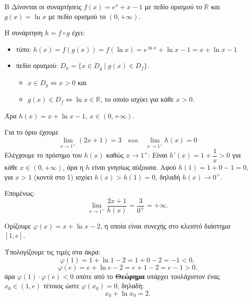 \begin{thema}{Β}
Δίνονται οι συναρτήσεις $f(x) = e^x + x - 1$ με πεδίο ορισμού το $\mathbb{R}$ και $g(x) = \ln x$ με πεδίο ορισμού το $(0, +\infty)$.

\begin{erwthma}

\item Η συνάρτηση $h = f \circ g$ έχει:
\begin{itemize}
    \item {τύπο:} $h(x) = f(g(x)) = f(\ln x) = e^{\ln x} + \ln x - 1 = x + \ln x - 1$
    \item {πεδίο ορισμού:} $D_h = \{x \in D_g \mid g(x) \in D_f\}$.
    \begin{itemize}[label=\tiny\faPlay]
        \item $x \in D_g \Leftrightarrow x > 0$ και
        \item $g(x) \in D_f \Leftrightarrow \ln x \in \mathbb{R}$, το οποίο ισχύει για κάθε $x > 0$.
    \end{itemize}
\end{itemize}
Άρα $h(x) = x + \ln x - 1$, $x \in (0, +\infty)$.

\item Για το όριο έχουμε
\[
\lim\limits_{x \to 1^+} (2x+1)=3\quad \text{και}\quad \lim\limits_{x \to 1^+} h(x)=0
\]
Ελέγχουμε το πρόσημο του $h(x)$ καθώς $x \to 1^+$:
Είναι $h'(x) = 1 + \dfrac{1}{x} > 0$ για κάθε $x \in (0,+\infty)$, άρα η $h$ είναι γνησίως αύξουσα.
Αφού $h(1) = 1 + 0 - 1 = 0$, για $x > 1$ (κοντά στο 1) ισχύει $h(x) > h(1) = 0$, δηλαδή $h(x) \to 0^+$.

Επομένως:
\[
\lim_{x \to 1^+} \frac{2x+1}{h(x)} = \frac{3}{0^+} = +\infty.
\]

\item Ορίζουμε $\varphi(x) = x + \ln x - 2$, η οποία είναι συνεχής στο κλειστό διάστημα $[1, e]$.

Υπολογίζουμε τις τιμές στα άκρα:
\[
\varphi(1) = 1 + \ln 1 - 2 = 1 + 0 - 2 = -1 < 0,
\]
\[
\varphi(e) = e + \ln e - 2 = e + 1 - 2 = e - 1 > 0.
\]
άρα $\varphi(1) \cdot \varphi(e) < 0$ οπότε από το \textbf{Θεώρημα } υπάρχει τουλάχιστον ένας $x_0 \in (1, e)$ τέτοιος ώστε $\varphi(x_0) = 0$, δηλαδή:
\[
x_0 + \ln x_0 = 2.
\]


\end{erwthma}
\end{thema}
